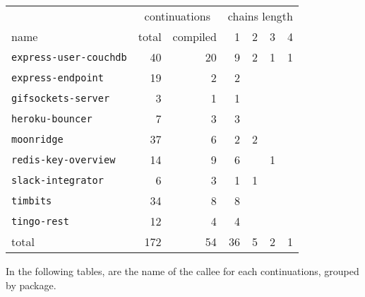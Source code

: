 \begin{tabularx}{\linewidth}{>{\ttfamily} X r r r r r r }
                                      & \multicolumn{2}{c}{continuations}      & \multicolumn{4}{c}{chains length}\\
name                                  & total              & compiled          & 1  & 2 & 3 & 4 \\
\hline
\texttt{express-user-couchdb}         & 40                 & 20                & 9  & 2 & 1 & 1 \\
\texttt{express-endpoint}             & 19                 & 2                 & 2              \\
\texttt{gifsockets-server}            & 3                  & 1                 & 1  &           \\ 
\texttt{heroku-bouncer}               & 7                  & 3                 & 3  &           \\
\texttt{moonridge}                    & 37                 & 6                 & 2  & 2         \\
\texttt{redis-key-overview}           & 14                 & 9                 & 6  &   & 1     \\
\texttt{slack-integrator}             & 6                  & 3                 & 1  & 1         \\
\texttt{timbits}                      & 34                 & 8                 & 8              \\
\texttt{tingo-rest}                   & 12                 & 4                 & 4              \\
\hline
total                                 & 172                & 54                & 36 & 5 & 2 & 1 \\
\end{tabularx}

\vfill\eject

In the following tables, are the name of the callee for each continuations, grouped by package.

